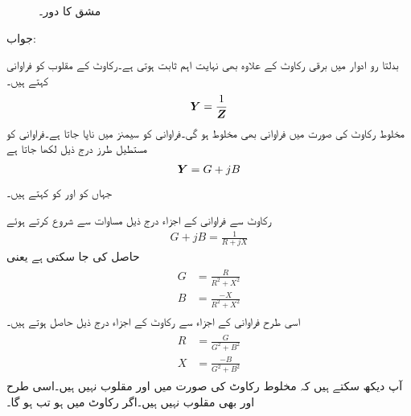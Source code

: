 \begin{figure}
\centering
{}
\caption{مشق  کا دور۔}
\label{شکل_بدلتا_متوازی_الف}
\end{figure} 

جواب:

بدلتا رو ادوار میں برقی رکاوٹ  کے علاوہ   بھی نہایت اہم ثابت ہوتی ہے۔رکاوٹ کے  مقلوب  کو فراوانی کہتے ہیں۔
\begin{align}
{\ensuremath{{\boldsymbol{Y}}}}=\frac{1}{{{\boldsymbol{Z}}}}
\end{align}
مخلوط رکاوٹ کی صورت میں فراوانی بھی مخلوط ہو گی۔فراوانی کو سیمنز  میں ناپا جاتا ہے۔فراوانی کو مستطیل طرز درج ذیل لکھا جاتا ہے
\begin{align}
{\ensuremath{{\boldsymbol{Y}}}}=G+jB
\end{align}
جہاں  کو  اور  کو  کہتے ہیں۔

رکاوٹ سے فراوانی کے اجزاء درج ذیل مساوات سے شروع کرتے ہوئے
\begin{align}
G+jB=\frac{1}{R+jX}
\end{align}
حاصل کی جا سکتی ہے یعنی
\begin{gather}
\begin{aligned}
G&=\frac{R}{R^2+X^2}\\
B&=\frac{-X}{R^2+X^2}
\end{aligned}
\end{gather}
اسی طرح فراوانی کے اجزاء سے رکاوٹ کے اجزاء درج ذیل حاصل ہوتے ہیں۔
\begin{gather}
\begin{aligned}
R&=\frac{G}{G^2+B^2}\\
X&=\frac{-B}{G^2+B^2}
\end{aligned}
\end{gather}
آپ دیکھ سکتے ہیں کہ مخلوط رکاوٹ کی صورت میں  اور  مقلوب  نہیں ہیں۔اسی طرح  اور  بھی مقلوب  نہیں ہیں۔اگر رکاوٹ میں  ہو تب  ہو گا۔

